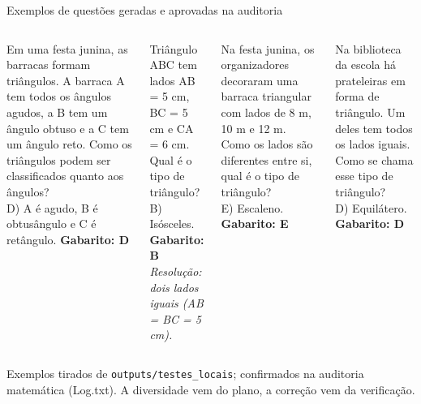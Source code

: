 \documentclass[aspectratio=169,11pt]{beamer}
\begin{document}
\begin{frame}{Exemplos de questões geradas e aprovadas na auditoria}
  \begin{columns}[T]
    \begin{quest}[title={\scriptsize 9º ano H17 --- festa junina (correta)}, coltitle=white, colbacktitle=accentblue, fonttitle=\bfseries]
      Em uma festa junina, as barracas formam triângulos. A barraca A tem todos os ângulos agudos, a B tem um ângulo obtuso e a C tem um ângulo reto. Como os triângulos podem ser classificados quanto aos ângulos?\\[2pt]
      D) A é agudo, B é obtusângulo e C é retângulo. \textbf{Gabarito: D}
    \end{quest}
    \vspace{3pt}
    \begin{quest}[title={\scriptsize 9º ano H17 --- sem contexto (correta)}, coltitle=white, colbacktitle=accentblue, fonttitle=\bfseries]
      Triângulo ABC tem lados AB = 5 cm, BC = 5 cm e CA = 6 cm. Qual é o tipo de triângulo?\\[2pt]
      B) Isósceles. \textbf{Gabarito: B}\\
      {\color{basegray}\emph{Resolução: dois lados iguais (AB = BC = 5 cm).}}
    \end{quest}
    \begin{quest}[title={\scriptsize 9º ano H17 --- barraca na festa junina (correta)}, coltitle=white, colbacktitle=accentblue, fonttitle=\bfseries]
      Na festa junina, os organizadores decoraram uma barraca triangular com lados de 8 m, 10 m e 12 m. Como os lados são diferentes entre si, qual é o tipo de triângulo?\\[2pt]
      E) Escaleno. \textbf{Gabarito: E}
    \end{quest}
    \vspace{3pt}
    \begin{quest}[title={\scriptsize 9º ano H17 --- prateleiras da biblioteca (correta)}, coltitle=white, colbacktitle=accentblue, fonttitle=\bfseries]
      Na biblioteca da escola há prateleiras em forma de triângulo. Um deles tem todos os lados iguais. Como se chama esse tipo de triângulo?\\[2pt]
      D) Equilátero. \textbf{Gabarito: D}
    \end{quest}
  \end{columns}
  \vspace{3pt}
  {\scriptsize Exemplos tirados de \texttt{outputs/testes\_locais}; confirmados na auditoria matemática (Log.txt). A diversidade vem do plano, a correção vem da verificação.}
\end{frame}
\end{document}
